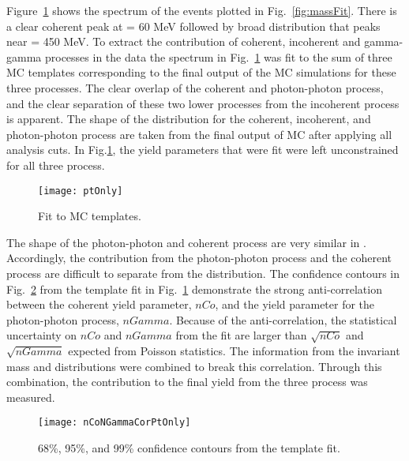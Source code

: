     Figure~\ref{fig:ptTemps} shows the \pt{} spectrum of the events plotted 
      in Fig.~\ref{fig:massFit}.  
    There is a clear coherent peak at \pt{} = 60 MeV followed by broad 
      distribution that peaks near \pt{} = 450 MeV. 
    To extract the contribution of coherent, incoherent and gamma-gamma 
      processes in the data the spectrum in  Fig.~\ref{fig:ptTemps} was fit to 
      the sum of three MC templates corresponding to the final output of the MC
      simulations for these three processes.       
    The clear overlap of the coherent and photon-photon process, and the 
      clear separation of these two lower \pt{} processes from the incoherent
      process is apparent.
    The shape of the \pt{} distribution for the coherent, incoherent, and 
      photon-photon process are taken from the final output of MC after
      applying all analysis cuts. 
    In Fig.\ref{fig:ptTemps}, the yield parameters that were fit were left
      unconstrained for all three process.

    \begin{figure}[!Hhbt]
      \centering
      \texttt{[image: ptOnly]}
      \caption{ Fit to MC \pt{} templates. }
      \label{fig:ptTemps}
    \end{figure}

    The shape of the photon-photon and coherent \JPsi{} process are very 
      similar in \pt{}.
    Accordingly, the contribution from the photon-photon process and the 
      coherent process are difficult to separate from the \pt{} distribution.
    The confidence contours in Fig.~\ref{fig:ptOnlyCor} from the template fit
      in Fig.~\ref{fig:ptTemps} demonstrate the strong anti-correlation 
      between the coherent yield parameter, $nCo$, and the yield parameter 
      for the photon-photon process, $nGamma$.
    Because of the anti-correlation, the statistical uncertainty on $nCo$ and 
      $nGamma$ from the fit are larger than $\sqrt{nCo}$ and $\sqrt{nGamma}$
      expected from Poisson statistics. 
    The information from the invariant mass and \pt{} distributions were
      combined to break this correlation. 
    Through this combination, the contribution to the final yield from 
      the three process was measured.

    \begin{figure}[!Hhbt]
      \centering
      \texttt{[image: nCoNGammaCorPtOnly]}
      \caption{68\%, 95\%, and 99\% confidence contours from the \pt{} 
        template fit. }
      \label{fig:ptOnlyCor}
    \end{figure}


